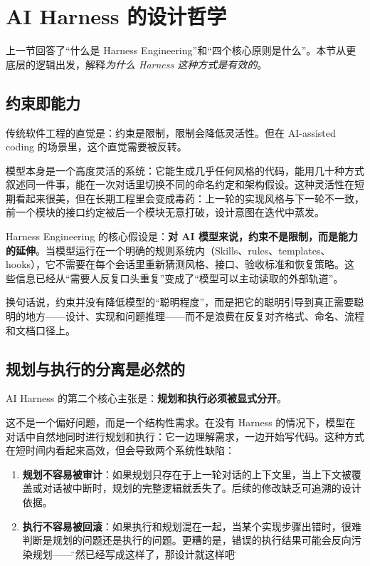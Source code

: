 \documentclass[
  outputdir=build,
  chapterstyle=cn,
  colorscheme=Simple,
  fontset=tech,
  code=false
]{Hypo-Note}
\begin{document}
\section{AI Harness 的设计哲学}

上一节回答了“什么是 Harness Engineering”和“四个核心原则是什么”。本节从更底层的逻辑出发，解释\emph{为什么 Harness 这种方式是有效的}。

\subsection{约束即能力}

传统软件工程的直觉是：约束是限制，限制会降低灵活性。但在 AI-assisted coding 的场景里，这个直觉需要被反转。

模型本身是一个高度灵活的系统：它能生成几乎任何风格的代码，能用几十种方式叙述同一件事，能在一次对话里切换不同的命名约定和架构假设。这种灵活性在短期看起来很美，但在长期工程里会变成毒药：上一轮的实现风格与下一轮不一致，前一个模块的接口约定被后一个模块无意打破，设计意图在迭代中蒸发。

Harness Engineering 的核心假设是：\textbf{对 AI 模型来说，约束不是限制，而是能力的延伸}。当模型运行在一个明确的规则系统内（Skills、rules、templates、hooks），它不需要在每个会话里重新猜测风格、接口、验收标准和恢复策略。这些信息已经从“需要人反复口头重复”变成了“模型可以主动读取的外部轨道”。

换句话说，约束并没有降低模型的“聪明程度”，而是把它的聪明引导到真正需要聪明的地方——设计、实现和问题推理——而不是浪费在反复对齐格式、命名、流程和文档口径上。

\subsection{规划与执行的分离是必然的}

AI Harness 的第二个核心主张是：\textbf{规划和执行必须被显式分开}。

这不是一个偏好问题，而是一个结构性需求。在没有 Harness 的情况下，模型在对话中自然地同时进行规划和执行：它一边理解需求，一边开始写代码。这种方式在短时间内看起来高效，但会导致两个系统性缺陷：

\begin{enumerate}[leftmargin=2em]
  \item \textbf{规划不容易被审计}：如果规划只存在于上一轮对话的上下文里，当上下文被覆盖或对话被中断时，规划的完整逻辑就丢失了。后续的修改缺乏可追溯的设计依据。
  \item \textbf{执行不容易被回滚}：如果执行和规划混在一起，当某个实现步骤出错时，很难判断是规划的问题还是执行的问题。更糟的是，错误的执行结果可能会反向污染规划——\"既然已经写成这样了，那设计就这样吧\"。
\end{enumerate}
\end{document}
